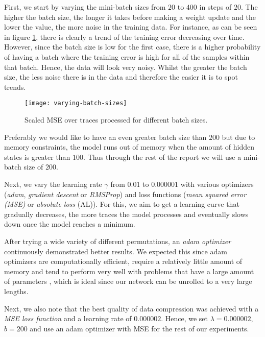 First, we start by varying the mini-batch sizes from $20$ to $400$ in steps of $20$.
The higher the batch size, the longer it takes before making a weight update and the lower the value, the more noise in the training data.
For instance, as can be seen in figure \ref{fig:varying-batch-sizes}, there is clearly a trend of the training error decreasing over time.
However, since the batch size is low for the first case, there is a higher probability of having a batch where the training error is high for all of the samples within that batch.
Hence, the data will look very noisy.
Whilst the greater the batch size, the less noise there is in the data and therefore the easier it is to spot trends.

\begin{figure}[ht]
  \centering
  \texttt{[image: varying-batch-sizes]}
  \caption{Scaled MSE over traces processed for different batch sizes.}
  \label{fig:varying-batch-sizes}
\end{figure}

Preferably we would like to have an even greater batch size than $200$ but due to memory constraints, the model runs out of memory when the amount of hidden states is greater than $100$.
Thus through the rest of the report we will use a mini-batch size of $200$.

Next, we vary the learning rate $\gamma$ from $0.01$ to $0.000001$ with various optimizers (\textit{adam}, \textit{gradient descent} or \textit{RMSProp}) and loss functions (\textit{mean squared error (MSE)} or \textit{absolute loss} (AL)).
For this, we aim to get a learning curve that gradually decreases, the more traces the model processes and eventually slows down once the model reaches a minimum.

After trying a wide variety of different permutations, an \textit{adam optimizer} continuously demonstrated better results.
We expected this since adam optimizers are computationally efficient, require a relatively little amount of memory and tend to perform very well with problems that have a large amount of parameters \cite{kingma2014adam},
which is ideal since our network can be unrolled to a very large lengths.

Next, we also note that the best quality of data compression was achieved with a \textit{MSE loss function} and a learning rate of $0.000002$.
Hence, we set $\lambda = 0.000002$, $b = 200$ and use an adam optimizer with MSE for the rest of our experiments.


